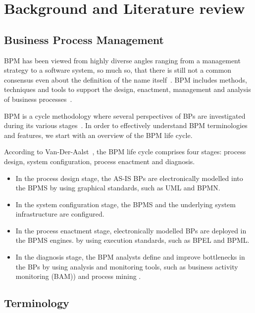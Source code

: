 \chapter{Background and Literature review}

\section{Business Process Management}

BPM has been viewed from highly diverse angles ranging from a management strategy to a software system, so much so, that there is still not a common consensus even about the definition of the name itself~\cite{van2003workflow}. BPM includes methods, techniques and tools to support the design, enactment, management and analysis of business processes~\cite{van2003workflow}.

BPM is a cycle methodology where several perspectives of BPs are investigated during its various stages~\cite{lodhi2013business}. In order to effectively understand BPM terminologies and features, we start with an overview of the BPM life cycle.

According to Van-Der-Aalst~\cite{van2003workflow}, the BPM life cycle comprises four
stages: process design, system configuration, process enactment and diagnosis.
\begin{itemize}
    \item In the process design stage, the AS-IS BPs are electronically modelled into the BPMS by using graphical standards, such as UML and BPMN.
    \item In the system configuration stage, the BPMS and the underlying system infrastructure are configured. 
    \item In the process enactment stage, electronically modelled BPs are deployed in the BPMS engines. by using execution standards, such as BPEL and BPML.
    \item In the diagnosis stage, the BPM analysts define and improve bottlenecks in the BPs by using analysis and monitoring tools, such as business activity monitoring (BAM)) and process mining .
\end{itemize}

\section{Terminology}


